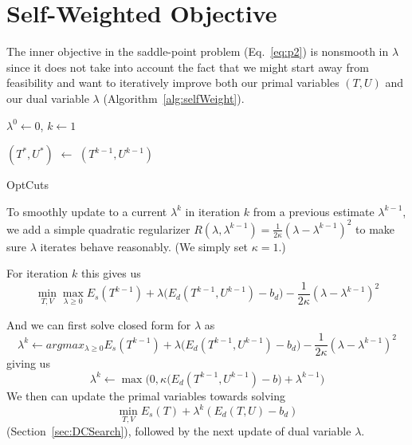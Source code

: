 
\section{Self-Weighted Objective}
\label{sec:self_weighting}


The inner objective in the saddle-point problem (Eq.~\ref{eq:p2}) is nonsmooth in $\lambda$ since it does not take into account the fact that we might start away from feasibility and want to iteratively improve both our primal variables $(T, U)$ and our dual variable $\lambda$ (Algorithm~\ref{alg:selfWeight}).

\begin{algorithm}[!h]
\SetAlgoLined
{}

$\lambda^0 \leftarrow 0$, $k \leftarrow 1$\;

$(T^*, U^*)$ $\leftarrow$ $(T^{k-1}, U^{k-1})$\; 

\caption{OptCuts}
\label{alg:selfWeight}
\end{algorithm}

To smoothly update to a current $\lambda^{k}$ in iteration $k$ from a previous estimate $\lambda^{k-1}$, we add a simple quadratic regularizer $R(\lambda,\lambda^{k-1}) = \frac{1}{2\kappa} (\lambda- \lambda^{k-1})^2$ to make sure $\lambda$ iterates behave reasonably. (We simply set $\kappa = 1$.)

For iteration $k$ this gives us 
\[ \min_{T,V} \max_{\lambda \geq 0} E_{s}(T^{k-1}) + \lambda \big( E_{d}(T^{k-1}, U^{k-1}) - b_d\big) - \frac{1}{2\kappa} (\lambda- \lambda^{k-1})^2 \]

And we can first solve closed form for $\lambda$ as 
\[ \lambda^{k} \leftarrow argmax_{\lambda \geq 0} E_{s}(T^{k-1}) + \lambda \big( E_{d}(T^{k-1}, U^{k-1}) - b_d\big) - \frac{1}{2\kappa} (\lambda- \lambda^{k-1})^2 \]
giving us 
\[ \lambda^{k} \leftarrow \max\big(0,\kappa \big( E_{d}(T^{k-1}, U^{k-1}) -b \big) + \lambda^{k-1}\big) \]
We then can update the primal variables towards solving
\[ \min_{T,V}  E_{s}(T) + \lambda^{k}  (E_{d}(T, U) - b_d) \]
(Section~\ref{sec:DCSearch}), followed by the next update of dual variable $\lambda$.

